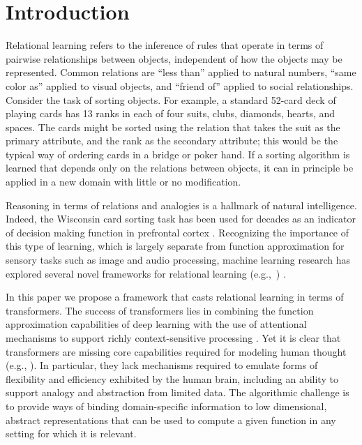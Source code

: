 \section{Introduction}
\label{sec:intro}

Relational learning refers to the inference of rules that operate in terms of pairwise relationships between 
objects, independent of how the objects may be represented. Common relations are ``less than'' applied to natural numbers, ``same color as'' applied to visual objects, and ``friend of'' applied to social relationships. Consider the task of sorting objects. For example, a standard 52-card deck of playing cards has 13 ranks in each of four suits, clubs, diamonds, hearts, and spaces. The cards might be sorted using the relation that takes 
the suit as the primary attribute, and the rank as the secondary attribute; this would be the typical 
way of ordering cards in a bridge or poker hand. If a sorting algorithm is learned that depends 
only on the relations between objects, it can in principle be applied in a new domain with little 
or no modification. 

Reasoning in terms of relations and analogies is a hallmark of natural intelligence. 
Indeed, the Wisconsin card sorting task \citep{berg} has been used for decades as an indicator of decision making function in prefrontal cortex \cite{monchi}. Recognizing the importance of this type of learning, which is largely separate from function approximation for sensory tasks such as image and audio processing, machine learning research has explored several novel frameworks for relational learning (e.g.,~\cite{TEM, NTM,episodicControl,esbn,mondal23learned,musslick2021rationalizing}) .

In this paper we propose a framework that casts relational learning in terms of transformers. 
The success of transformers lies in combining the function approximation capabilities of deep learning with the use of attentional mechanisms to support richly context-sensitive processing \citep{transformers,vaswani2017attention,kerg2020untangling}. Yet it is clear that transformers are missing core capabilities required for modeling human thought (e.g., \cite{mahowald2023dissociating}).  In particular, they lack mechanisms required to emulate forms of flexibility and efficiency exhibited by the human brain, including an ability to support analogy and abstraction from limited data. The algorithmic challenge is to provide ways of binding domain-specific information to low dimensional, abstract representations that can be used to compute a given function in any setting for which it is relevant. 


